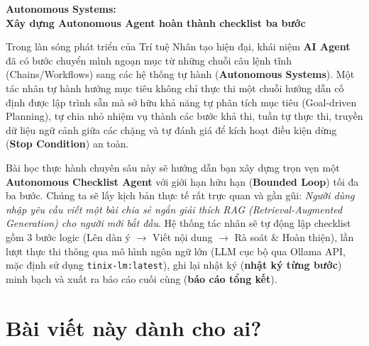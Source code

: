 \documentclass[]{article}
\begin{document}
\thispagestyle{fancy}
\hypertarget{autonomous-systems}{%
\begin{center}\color{primary}\fontsize{26}{32}\selectfont\bfseries Autonomous Systems:\\ Xây dựng Autonomous Agent hoàn thành checklist ba bước\end{center}\vspace{0.5cm}\label{autonomous-systems}}

Trong làn sóng phát triển của Trí tuệ Nhân tạo hiện đại, khái niệm \textbf{AI Agent} đã có bước chuyển mình ngoạn mục từ những chuỗi câu lệnh tĩnh (Chains/Workflows) sang các hệ thống tự hành (\textbf{Autonomous Systems}). Một tác nhân tự hành hướng mục tiêu không chỉ thực thi một chuỗi hướng dẫn cố định được lập trình sẵn mà sở hữu khả năng tự phân tích mục tiêu (Goal-driven Planning), tự chia nhỏ nhiệm vụ thành các bước khả thi, tuần tự thực thi, truyền dữ liệu ngữ cảnh giữa các chặng và tự đánh giá để kích hoạt điều kiện dừng (\textbf{Stop Condition}) an toàn.

Bài học thực hành chuyên sâu này sẽ hướng dẫn bạn xây dựng trọn vẹn một \textbf{Autonomous Checklist Agent} với giới hạn hữu hạn (\textbf{Bounded Loop}) tối đa ba bước. Chúng ta sẽ lấy kịch bản thực tế rất trực quan và gần gũi: \textit{Người dùng nhập yêu cầu viết một bài chia sẻ ngắn giải thích RAG (Retrieval-Augmented Generation) cho người mới bắt đầu}. Hệ thống tác nhân sẽ tự động lập checklist gồm 3 bước logic (Lên dàn ý $\rightarrow$ Viết nội dung $\rightarrow$ Rà soát \& Hoàn thiện), lần lượt thực thi thông qua mô hình ngôn ngữ lớn (LLM cục bộ qua Ollama API, mặc định sử dụng \texttt{tinix-lm:latest}), ghi lại nhật ký (\textbf{nhật ký từng bước}) minh bạch và xuất ra báo cáo cuối cùng (\textbf{báo cáo tổng kết}).

\hypertarget{bai-viet-nay-danh-cho-ai}{%
\section*{Bài viết này dành cho ai?}\label{bai-viet-nay-danh-cho-ai}}
\end{document}

